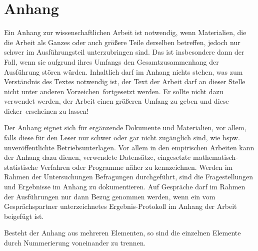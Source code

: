 
\section*{Anhang}
\label{Anhang}

Ein Anhang zur wissenschaftlichen Arbeit ist notwendig, wenn Materialien, die die Arbeit als Ganzes oder auch größere Teile derselben betreffen, jedoch nur schwer im Ausführungsteil unterzubringen sind. Das ist insbesondere dann der Fall, wenn sie aufgrund ihres Umfangs den Gesamtzusammenhang der Ausführung stören würden. Inhaltlich darf im Anhang nichts stehen, was zum Verständnis des Textes notwendig ist, der Text der Arbeit darf an dieser Stelle nicht \glqq unter anderen Vorzeichen\grqq~fortgesetzt werden. Er sollte nicht dazu verwendet werden, der Arbeit einen größeren Umfang zu geben und diese \glqq dicker\grqq~erscheinen zu lassen!

Der Anhang eignet sich für ergänzende Dokumente und Materialien, vor allem, falls diese für den Leser nur schwer oder gar nicht zugänglich sind, wie bspw. unveröffentlichte Betriebsunterlagen.
Vor allem in den empirischen Arbeiten kann der Anhang dazu dienen, verwendete Datensätze, eingesetzte mathematisch-statistische Verfahren oder Programme näher zu kennzeichnen. Werden im Rahmen der Untersuchungen Befragungen durchgeführt, sind die Fragestellungen und Ergebnisse im Anhang zu dokumentieren. Auf Gespräche darf im Rahmen der Ausführungen nur dann Bezug genommen werden, wenn ein vom Gesprächspartner unterzeichnetes Ergebnis-Protokoll im Anhang der Arbeit beigefügt ist.

Besteht der Anhang aus mehreren Elementen, so sind die einzelnen Elemente durch Nummerierung voneinander zu trennen.

